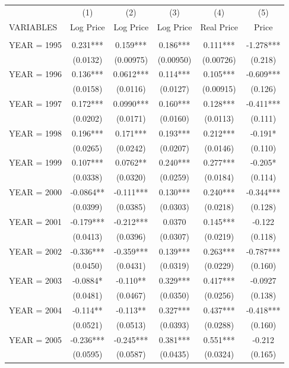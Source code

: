 \begin{tabular}{lccccc} \hline
 & (1) & (2) & (3) & (4) & (5) \\
VARIABLES & Log Price & Log Price & Log Price & Real Price & Price \\ \hline
 &  &  &  &  &  \\
YEAR = 1995 & 0.231*** & 0.159*** & 0.186*** & 0.111*** & -1.278*** \\
 & (0.0132) & (0.00975) & (0.00950) & (0.00726) & (0.218) \\
YEAR = 1996 & 0.136*** & 0.0612*** & 0.114*** & 0.105*** & -0.609*** \\
 & (0.0158) & (0.0116) & (0.0127) & (0.00915) & (0.126) \\
YEAR = 1997 & 0.172*** & 0.0990*** & 0.160*** & 0.128*** & -0.411*** \\
 & (0.0202) & (0.0171) & (0.0160) & (0.0113) & (0.111) \\
YEAR = 1998 & 0.196*** & 0.171*** & 0.193*** & 0.212*** & -0.191* \\
 & (0.0265) & (0.0242) & (0.0207) & (0.0146) & (0.110) \\
YEAR = 1999 & 0.107*** & 0.0762** & 0.240*** & 0.277*** & -0.205* \\
 & (0.0338) & (0.0320) & (0.0259) & (0.0184) & (0.114) \\
YEAR = 2000 & -0.0864** & -0.111*** & 0.130*** & 0.240*** & -0.344*** \\
 & (0.0399) & (0.0385) & (0.0303) & (0.0218) & (0.128) \\
YEAR = 2001 & -0.179*** & -0.212*** & 0.0370 & 0.145*** & -0.122 \\
 & (0.0413) & (0.0396) & (0.0307) & (0.0219) & (0.118) \\
YEAR = 2002 & -0.336*** & -0.359*** & 0.139*** & 0.263*** & -0.787*** \\
 & (0.0450) & (0.0431) & (0.0319) & (0.0229) & (0.160) \\
YEAR = 2003 & -0.0884* & -0.110** & 0.329*** & 0.417*** & -0.0927 \\
 & (0.0481) & (0.0467) & (0.0350) & (0.0256) & (0.138) \\
YEAR = 2004 & -0.114** & -0.113** & 0.327*** & 0.437*** & -0.418*** \\
 & (0.0521) & (0.0513) & (0.0393) & (0.0288) & (0.160) \\
YEAR = 2005 & -0.236*** & -0.245*** & 0.381*** & 0.551*** & -0.212 \\
 & (0.0595) & (0.0587) & (0.0435) & (0.0324) & (0.165) \\

\end{tabular}
